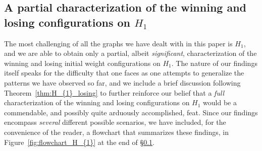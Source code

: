\documentclass[11pt,reqno]{amsart}
\theoremstyle{definition}
\theoremstyle{definition}
\begin{document}
\subsection{A partial characterization of the winning and losing configurations on $H_{1}$}\label{subsubsec:H_{1}_main_results}
The most challenging of all the graphs we have dealt with in this paper is $H_{1}$, and we are able to obtain only a partial, albeit \emph{significant}, characterization of the winning and losing initial weight configurations on $H_{1}$. The nature of our findings itself speaks for the difficulty that one faces as one attempts to generalize the patterns we have observed so far, and we include a brief discussion following Theorem~\ref{thm:H_{1}_losing} to further reinforce our belief that a \emph{full} characterization of the winning and losing configurations on $H_{1}$ would be a commendable, and possibly quite arduously accomplished, feat. Since our findings encompass \emph{several} different possible scenarios, we have included, for the convenience of the reader, a flowchart that summarizes these findings, in Figure~\ref{fig:flowchart_H_{1}} at the end of \S\ref{subsubsec:H_{1}_main_results}.
\end{document}
